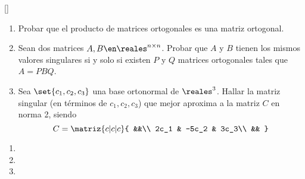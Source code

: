 \begin{enunciado}{\ejExtra} {\tiny[]}
  \begin{enumerate}[label=(\alph*)]
    \item Probar que el producto de matrices ortogonales es una matriz ortogonal.

    \item Sean dos matrices $A, B \en \reales^{n \times n}$. Probar que $A$ y $B$ tienen
          los mismos valores singulares si y solo si existen $P$ y $Q$ matrices ortogonales tales que $A = PBQ$.

    \item Sea $\set{c_1, c_2, c_3}$ una base ortonormal de $\reales^3$. Hallar la matriz singular (en términos de $c_1, c_2, c_3$)
          que mejor aproxima a la matriz $C$ en norma 2, siendo
          $$
            C =
            \matriz{c|c|c}{
              &&\\
              2c_1 & -5c_2 & 3c_3\\
              &&
            }
          $$
  \end{enumerate}
\end{enunciado}

\begin{enumerate}[label=(\alph*)]
  \item \hacer
  \item \hacer
  \item \hacer
\end{enumerate}
